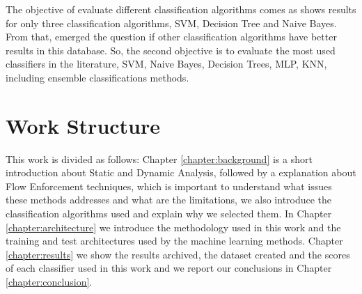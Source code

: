 The objective of evaluate different classification algorithms comes as \cite{rasthofer2014machine} shows results  for only three classification algorithms, SVM, Decision Tree and Naive Bayes. From that, emerged the question if other classification algorithms have better results in this database. So, the second objective is to evaluate the most used classifiers in the literature, SVM, Naive Bayes, Decision Trees, MLP, KNN, including ensemble classifications methods.


\section{Work Structure}\label{section:structure}

This work is divided as follows: Chapter \ref{chapter:background} is a short introduction about Static and Dynamic Analysis, followed by a explanation about Flow Enforcement techniques, which is important to understand what issues these methods addresses and what are the limitations, we also introduce the classification algorithms used and explain why we selected them. In Chapter \ref{chapter:architecture} we introduce the methodology used in this work and the training and test architectures used by the machine learning methods. Chapter \ref{chapter:results} we show the results archived, the dataset created and the scores of each classifier used in this work and we report our conclusions in Chapter \ref{chapter:conclusion}.
